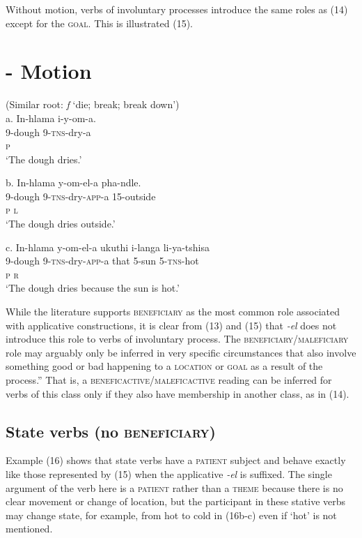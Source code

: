 \documentclass[output=paper]{langsci/langscibook}
\begin{document}
  Without motion, verbs of involuntary processes introduce the same roles as (14) except for the \textsc{goal. }This is illustrated (15).

\chapter[{}- Motion   ]{{}- Motion   }
     (Similar root: \textit{f} ‘die; break; break down’)\\
\gll a.  In-hlama      i-y-om-a. \\
         9-dough          9-\textsc{tns}{}-dry-a  \\
         \textsc{p }\\
\glt     ‘The dough dries.’
\z

\gll   b.  In-hlama    y-om-el-a            pha-ndle. \\
         9-dough      9-\textsc{tns}{}-dry-\textsc{app}{}-a    15-outside \\
         \textsc{p                  l}\\
\glt     ‘The dough dries outside.’
\z

\gll   c.  In-hlama    y-om-el-a             ukuthi    i-langa    li-ya-tshisa \\
         9-dough      9-\textsc{tns}{}-dry-\textsc{app}{}-a  that     5-sun    5-\textsc{tns}{}-hot\\
         \textsc{p                r}\\
\glt     ‘The dough dries because the sun is hot.’ 
\z

While the literature supports \textsc{beneficiary} as the most common role associated with applicative constructions, it is clear from (13) and (15) that \textit{{}-el} does not introduce this role to verbs of involuntary process. The \textsc{beneficiary}/\textsc{maleficiary} role may arguably only be inferred in very specific circumstances that also involve something good or bad happening to a \textsc{location} or \textsc{goal} as a result of the process.” That is, a \textsc{beneficactive}/\textsc{maleficactive} reading can be inferred for verbs of this class only if they also have membership in another class, as in (14).

\section{State verbs (no \textsc{beneficiary)}}

Example (16) shows that state verbs have a \textsc{patient} subject and behave exactly like those represented by (15) when the applicative \textit{{}-el} is suffixed. The single argument of the verb here is a \textsc{patient} rather than a \textsc{theme} because there is no clear movement or change of location, but the participant in these stative verbs may change state, for example, from hot to cold in (16b-c) even if ‘hot’ is not mentioned. 
\end{document}
